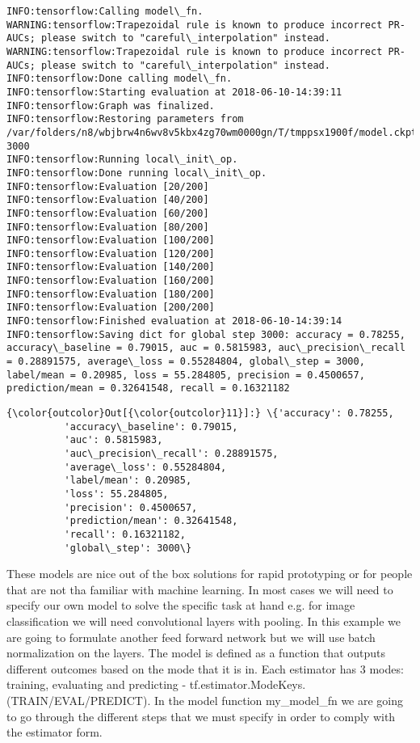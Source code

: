\documentclass[11pt]{article}
\begin{document}
    \begin{Verbatim}[commandchars=\\\{\}]
INFO:tensorflow:Calling model\_fn.
WARNING:tensorflow:Trapezoidal rule is known to produce incorrect PR-AUCs; please switch to "careful\_interpolation" instead.
WARNING:tensorflow:Trapezoidal rule is known to produce incorrect PR-AUCs; please switch to "careful\_interpolation" instead.
INFO:tensorflow:Done calling model\_fn.
INFO:tensorflow:Starting evaluation at 2018-06-10-14:39:11
INFO:tensorflow:Graph was finalized.
INFO:tensorflow:Restoring parameters from /var/folders/n8/wbjbrw4n6wv8v5kbx4zg70wm0000gn/T/tmppsx1900f/model.ckpt-3000
INFO:tensorflow:Running local\_init\_op.
INFO:tensorflow:Done running local\_init\_op.
INFO:tensorflow:Evaluation [20/200]
INFO:tensorflow:Evaluation [40/200]
INFO:tensorflow:Evaluation [60/200]
INFO:tensorflow:Evaluation [80/200]
INFO:tensorflow:Evaluation [100/200]
INFO:tensorflow:Evaluation [120/200]
INFO:tensorflow:Evaluation [140/200]
INFO:tensorflow:Evaluation [160/200]
INFO:tensorflow:Evaluation [180/200]
INFO:tensorflow:Evaluation [200/200]
INFO:tensorflow:Finished evaluation at 2018-06-10-14:39:14
INFO:tensorflow:Saving dict for global step 3000: accuracy = 0.78255, accuracy\_baseline = 0.79015, auc = 0.5815983, auc\_precision\_recall = 0.28891575, average\_loss = 0.55284804, global\_step = 3000, label/mean = 0.20985, loss = 55.284805, precision = 0.4500657, prediction/mean = 0.32641548, recall = 0.16321182

    \end{Verbatim}

\begin{Verbatim}[commandchars=\\\{\}]
{\color{outcolor}Out[{\color{outcolor}11}]:} \{'accuracy': 0.78255,
          'accuracy\_baseline': 0.79015,
          'auc': 0.5815983,
          'auc\_precision\_recall': 0.28891575,
          'average\_loss': 0.55284804,
          'label/mean': 0.20985,
          'loss': 55.284805,
          'precision': 0.4500657,
          'prediction/mean': 0.32641548,
          'recall': 0.16321182,
          'global\_step': 3000\}
\end{Verbatim}
            
    These models are nice out of the box solutions for rapid prototyping or
for people that are not tha familiar with machine learning. In most
cases we will need to specify our own model to solve the specific task
at hand e.g. for image classification we will need convolutional layers
with pooling. In this example we are going to formulate another feed
forward network but we will use batch normalization on the layers. The
model is defined as a function that outputs different outcomes based on
the mode that it is in. Each estimator has 3 modes: training, evaluating
and predicting - tf.estimator.ModeKeys.(TRAIN/EVAL/PREDICT). In the
model function my\_model\_fn we are going to go through the different
steps that we must specify in order to comply with the estimator form.
\end{document}
